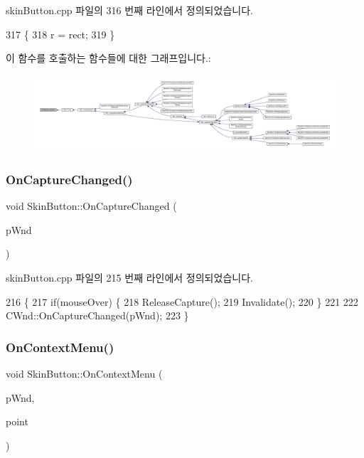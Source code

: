 skin\+Button.\+cpp 파일의 316 번째 라인에서 정의되었습니다.


\begin{DoxyCode}
317 \{
318   r = rect;
319 \}
\end{DoxyCode}
이 함수를 호출하는 함수들에 대한 그래프입니다.\+:
\nopagebreak
\begin{figure}[H]
\begin{center}
\leavevmode
\includegraphics[width=350pt]{class_skin_button_aef7f1ced23d060545eabd5b57175143a_icgraph}
\end{center}
\end{figure}
\mbox{\label{class_skin_button_ad4f3d9812259e8f4a9df22a14ae06c6f}} 
\subsubsection{\texorpdfstring{On\+Capture\+Changed()}{OnCaptureChanged()}}
{\footnotesize\ttfamily void Skin\+Button\+::\+On\+Capture\+Changed (\begin{DoxyParamCaption}\item[{C\+Wnd $\ast$}]{p\+Wnd }\end{DoxyParamCaption})\hspace{0.3cm}{\ttfamily [protected]}}



skin\+Button.\+cpp 파일의 215 번째 라인에서 정의되었습니다.


\begin{DoxyCode}
216 \{
217   \textcolor{keywordflow}{if}(mouseOver) \{
218     ReleaseCapture();
219     Invalidate();
220   \}
221   
222   CWnd::OnCaptureChanged(pWnd);
223 \}
\end{DoxyCode}
\mbox{\label{class_skin_button_a1d8e1d9486a36b42c1a1d2a26bde5efa}} 
\subsubsection{\texorpdfstring{On\+Context\+Menu()}{OnContextMenu()}}
{\footnotesize\ttfamily void Skin\+Button\+::\+On\+Context\+Menu (\begin{DoxyParamCaption}\item[{C\+Wnd $\ast$}]{p\+Wnd,  }\item[{C\+Point}]{point }\end{DoxyParamCaption})\hspace{0.3cm}{\ttfamily [protected]}}



